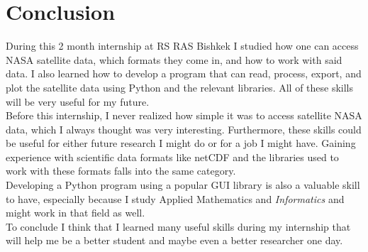 \documentclass[../00_main.tex]{subfiles}
\begin{document}
\section{Conclusion}

During this 2 month internship at RS RAS Bishkek I studied how
one can access NASA satellite data, which formats they come in, and how to work
with said data. I also learned how to develop a program that can read, process,
export, and plot the satellite data using Python and the relevant libraries.
All of these skills will be very useful for my future.\\
Before this internship, I never realized how simple it was to access satellite
NASA data, which I always thought was very interesting. Furthermore, these
skills could be useful for either future research I might do or for a job
I might have. Gaining experience with scientific data formats like netCDF and
the libraries used to work with these formats falls into the same category.\\
Developing a Python program using a popular GUI library is also a valuable
skill to have, especially because I study Applied Mathematics and
\textit{Informatics} and might work in that field as well.\\
To conclude I think that I learned many useful skills during my internship that
will help me be a better student and maybe even a better researcher one day.
\end{document}
